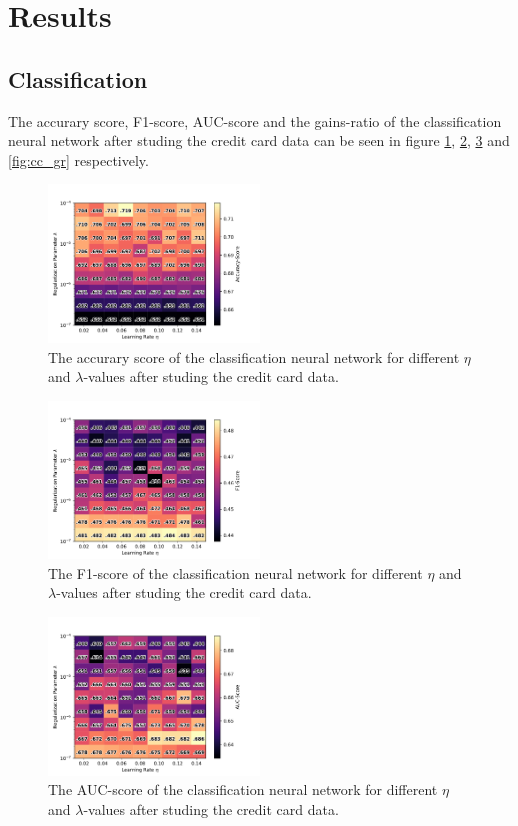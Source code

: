 \section{Results}
    \subsection{Classification}

		The accurary score, F1-score, AUC-score and the gains-ratio of the classification neural network after studing the credit card data can be seen in figure \ref{fig:cc_acc}, \ref{fig:cc_F1}, \ref{fig:cc_auc} and \ref{fig:cc_gr} respectively.

		\begin{figure}[H]
			\centering
			\includegraphics[width=0.5\textwidth]{figures/cc_res_0.pdf}
			\caption{The accurary score of the classification neural network for different $\eta$ and $\lambda$-values after studing the credit card data.}
			\label{fig:cc_acc}
		\end{figure}
		\begin{figure}[H]
			\centering
			\includegraphics[width=0.5\textwidth]{figures/cc_res_1.pdf}
			\caption{The F1-score of the classification neural network for different $\eta$ and $\lambda$-values after studing the credit card data.}
			\label{fig:cc_F1}
		\end{figure}
		\begin{figure}[H]
			\centering
			\includegraphics[width=0.5\textwidth]{figures/cc_res_2.pdf}
			\caption{The AUC-score of the classification neural network for different $\eta$ and $\lambda$-values after studing the credit card data.}
			\label{fig:cc_auc}
		\end{figure}

